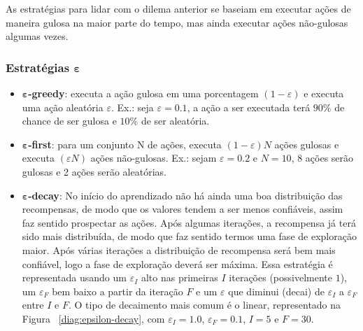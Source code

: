 \documentclass{article}
\begin{document}
            As estratégias para lidar com o dilema anterior se baseiam em executar ações de maneira gulosa na maior parte do tempo, mas ainda executar ações não-gulosas algumas vezes.
        
            \subsubsection{Estratégias $\boldsymbol\varepsilon$}
            
                \begin{itemize}
                    \item \textbf{$\boldsymbol\varepsilon$-greedy}: executa a ação gulosa em uma porcentagem $(1-\varepsilon)$ e executa uma ação aleatória $\varepsilon$. Ex.: seja $\varepsilon = 0.1$, a ação a ser executada terá $90\%$ de chance de ser gulosa e $10\%$ de ser aleatória.
                    \item \textbf{$\boldsymbol\varepsilon$-first}: para um conjunto N de ações, executa $(1 - \varepsilon)N$ ações gulosas e executa $(\varepsilon N)$ ações não-gulosas. Ex.: sejam $\varepsilon = 0.2$ e $N = 10$, 8 ações serão gulosas e 2 ações serão aleatórias.
                    \item \textbf{$\boldsymbol\varepsilon$-decay}: No início do aprendizado não há ainda uma boa distribuição das recompensas, de modo que os valores tendem a ser menos confiáveis, assim faz sentido prospectar as ações. Após algumas iterações, a recompensa já terá sido mais distribuída, de modo que faz sentido termos uma fase de exploração maior. Após várias iterações a distribuição de recompensa será bem mais confiável, logo a fase de exploração deverá ser máxima. Essa estratégia é representada usando um $\varepsilon_{I}$ alto nas primeiras $I$ iterações (possivelmente $1$), um $\varepsilon_{F}$ bem baixo a partir da iteração $F$ e um $\varepsilon$ que diminui (decai) de $\varepsilon_{I}$ a $\varepsilon_{F}$ entre $I$ e $F$. O tipo de decaimento mais comum é o linear, representado na Figura~ \ref{diag:epsilon-decay}, com $\varepsilon_{I} = 1.0$, $\varepsilon_{F} = 0.1$, $I = 5$ e $F = 30$.
                    

\end{itemize}
\end{document}

